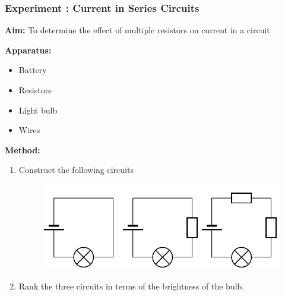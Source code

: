             \subsubsection{ Experiment : Current in Series Circuits}
            \nopagebreak
            \label{m38776*id66871}\noindent{}\textbf{Aim:}
          To determine the effect of multiple resistors on current in a circuit\par 
        \label{m38776*id66886}\noindent{}\textbf{Apparatus:}
        \label{m38776*id66895}\begin{itemize}[noitemsep]
            \label{m38776*uid49}\item Battery
\label{m38776*uid50}\item Resistors
\label{m38776*uid51}\item Light bulb
\label{m38776*uid52}\item Wires
\end{itemize}
        \par 
        \label{m38776*id66948}\noindent{}\textbf{Method:}
        \label{m38776*id66957}\begin{enumerate}[noitemsep, label=\textbf{\arabic*}. ] 
            \label{m38776*uid53}\item Construct the following circuits
    \setcounter{subfigure}{0}
	\begin{figure}[H] %
    \begin{center}
    \label{m38776*id66976!!!underscore!!!media}\label{m38776*id66976!!!underscore!!!printimage}\includegraphics[width=\columnwidth]{col11305.imgs/m38776_PG10C9_027.png} %
      \vspace{2pt}
    \vspace{.1in}
    \end{center}
 \end{figure}       \label{m38776*uid54}\item Rank the three circuits in terms of the brightness of the bulb.
\end{enumerate}

